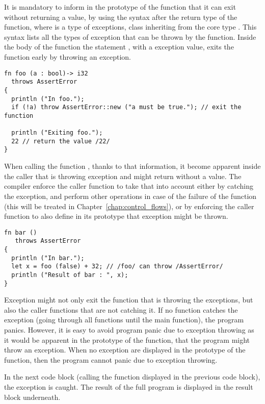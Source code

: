 It is mandatory to inform in the prototype of the function that it can exit
without returning a value, by using the syntax  after
the return type of the function, where  is a type of exceptions, class
inheriting from the core type . This syntax
lists all the types of exception that can be thrown by the function. Inside the
body of the function the statement , with  a
exception value, exits the function early by throwing an exception.

\begin{lstlisting}[style=coloredverbatim]
fn foo (a : bool)-> i32
  throws AssertError
{
  println ("In foo.");
  if (!a) throw AssertError::new ("a must be true."); // exit the function

  println ("Exiting foo.");
  22 // return the value /22/
}
\end{lstlisting}

When calling the function , thanks to that information, it become
apparent inside the caller that  is throwing exception and might
return without a value. The compiler enforce the caller function to take that
into account either by catching the exception, and perform other operations in
case of the failure of the function  (this will be treated in
Chapter~\ref{chap:control_flows}), or by enforcing the caller function to also
define in its prototype that exception might be thrown.

\begin{lstlisting}[style=coloredverbatim]
fn bar ()
   throws AssertError
{
  println ("In bar.");
  let x = foo (false) + 32; // /foo/ can throw /AssertError/
  println ("Result of bar : ", x);
}
\end{lstlisting}

Exception might not only exit the function that is throwing the exceptions, but
also the caller functions that are not catching it. If no function catches the
exception (going through all functions until the main function), the program
panics. However, it is easy to avoid program panic due to exception throwing as
it would be apparent in the prototype of the  function, that the
program might throw an exception. When no exception are displayed in the
prototype of the  function, then the program cannot panic due to
exception throwing.

In the next code block (calling the  function displayed in the
previous code block), the exception is caught. The result of the full program is
displayed in the result block underneath.

